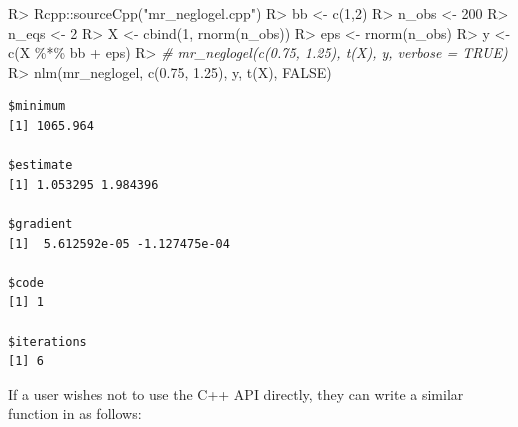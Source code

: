 \documentclass[article]{jss}
\newenvironment{Shaded}{\begin{snugshade}}{\end{snugshade}}
\newcommand{\CommentTok}[1]{\textcolor[rgb]{0.56,0.35,0.01}{\textit{#1}}}
\newcommand{\ConstantTok}[1]{\textcolor[rgb]{0.00,0.00,0.00}{#1}}
\newcommand{\DecValTok}[1]{\textcolor[rgb]{0.00,0.00,0.81}{#1}}
\newcommand{\FloatTok}[1]{\textcolor[rgb]{0.00,0.00,0.81}{#1}}
\newcommand{\FunctionTok}[1]{\textcolor[rgb]{0.00,0.00,0.00}{#1}}
\newcommand{\NormalTok}[1]{#1}
\newcommand{\OtherTok}[1]{\textcolor[rgb]{0.56,0.35,0.01}{#1}}
\newcommand{\SpecialCharTok}[1]{\textcolor[rgb]{0.00,0.00,0.00}{#1}}
\newcommand{\StringTok}[1]{\textcolor[rgb]{0.31,0.60,0.02}{#1}}
\renewcommand{\|}{\,|\,}
\begin{document}
\begin{Shaded}
\begin{Highlighting}[]
\NormalTok{R}\SpecialCharTok{\textgreater{}}\NormalTok{ Rcpp}\SpecialCharTok{::}\FunctionTok{sourceCpp}\NormalTok{(}\StringTok{"mr\_neglogel.cpp"}\NormalTok{)}
\NormalTok{R}\SpecialCharTok{\textgreater{}}\NormalTok{ bb }\OtherTok{\textless{}{-}} \FunctionTok{c}\NormalTok{(}\DecValTok{1}\NormalTok{,}\DecValTok{2}\NormalTok{)}
\NormalTok{R}\SpecialCharTok{\textgreater{}}\NormalTok{ n\_obs }\OtherTok{\textless{}{-}} \DecValTok{200}
\NormalTok{R}\SpecialCharTok{\textgreater{}}\NormalTok{ n\_eqs }\OtherTok{\textless{}{-}} \DecValTok{2}
\NormalTok{R}\SpecialCharTok{\textgreater{}}\NormalTok{ X }\OtherTok{\textless{}{-}} \FunctionTok{cbind}\NormalTok{(}\DecValTok{1}\NormalTok{, }\FunctionTok{rnorm}\NormalTok{(n\_obs))}
\NormalTok{R}\SpecialCharTok{\textgreater{}}\NormalTok{ eps }\OtherTok{\textless{}{-}} \FunctionTok{rnorm}\NormalTok{(n\_obs)}
\NormalTok{R}\SpecialCharTok{\textgreater{}}\NormalTok{ y }\OtherTok{\textless{}{-}} \FunctionTok{c}\NormalTok{(X }\SpecialCharTok{\%*\%}\NormalTok{ bb }\SpecialCharTok{+}\NormalTok{ eps)}
\NormalTok{R}\SpecialCharTok{\textgreater{}} \CommentTok{\# mr\_neglogel(c(0.75, 1.25), t(X), y, verbose = TRUE)}
\NormalTok{R}\SpecialCharTok{\textgreater{}} \FunctionTok{nlm}\NormalTok{(mr\_neglogel, }\FunctionTok{c}\NormalTok{(}\FloatTok{0.75}\NormalTok{, }\FloatTok{1.25}\NormalTok{), y, }\FunctionTok{t}\NormalTok{(X), }\ConstantTok{FALSE}\NormalTok{)}
\end{Highlighting}
\end{Shaded}

\begin{verbatim}
$minimum
[1] 1065.964

$estimate
[1] 1.053295 1.984396

$gradient
[1]  5.612592e-05 -1.127475e-04

$code
[1] 1

$iterations
[1] 6
\end{verbatim}

If a user wishes not to use the C++ API directly, they can write a similar function in  as follows:
\end{document}
